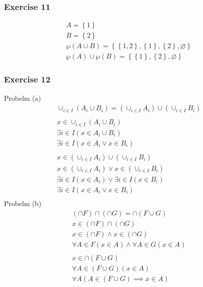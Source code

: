 \begin{questions}
\subsubsection{Exercise 11}
\begin{align*}
 A = \left\{1 \right\} \\
 B = \left\{2 \right\} \\
 \wp(A \cup B) = \left\{\left\{1,2 \right\},\left\{1 \right\}, \left\{2 \right\}, \varnothing  \right\} \\
 \wp(A) \cup \wp(B) = \left\{ \left\{1 \right\},\left\{2 \right\}, \varnothing  \right\} 
\end{align*}

\subsubsection{Exercise 12}
Probelm (a)
\begin{align*}
  \cup_{i \in I}(A_i \cup B_i) = (\cup_{i \in I}A_i) \cup (\cup_{i \in  I}B_i) \\\\
  x \in \cup_{i \in I}(A_i \cup B_i) \\
  \exists i \in I(x \in A_i \cup B_i) \\
  \exists i \in I(x \in A_i \lor x \in B_i)\\\\
  x \in (\cup_{i \in I}A_i) \cup (\cup_{i \in I}B_i) \\
  x \in (\cup_{i \in I}A_i) \lor x \in (\cup_{i \in I}B_i) \\
  \exists i \in I(x \in A_i) \lor \exists i \in I(x \in B_i) \\
  \exists i \in I(x \in A_i \lor x \in B_i) \\
\end{align*}
Probelm (b)
\begin{align*}
  (\cap F) \cap (\cap G) = \cap(F \cup G)\\
  x \in (\cap F) \cap (\cap G) \\
  x \in (\cap F) \land x \in (\cap G) \\
  \forall A \in F(x \in A) \land \forall A \in G(x \in A)\\\\
  x \in \cap(F \cup G) \\
  \forall A \in (F \cup G)(x \in A)\\
  \forall A(A \in (F \cup G) \implies x \in A) \\

\end{align*}
\end{questions}
